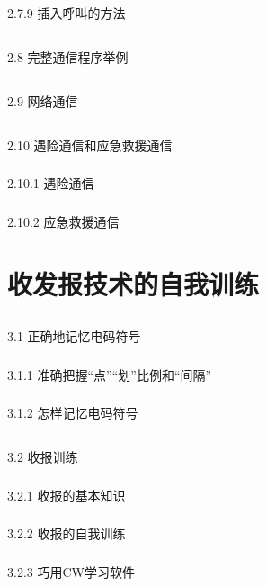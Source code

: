 \documentclass[12pt,UTF8]{ctexbook}
\begin{document}
\subsection{}2.7.9 插入呼叫的方法
\section{}2.8 完整通信程序举例
\section{}2.9 网络通信
\section{}2.10 遇险通信和应急救援通信
\subsection{}2.10.1 遇险通信
\subsection{}2.10.2 应急救援通信

\chapter{收发报技术的自我训练}

\section{}3.1 正确地记忆电码符号
\subsection{}3.1.1 准确把握“点”“划”比例和“间隔”
\subsection{}3.1.2 怎样记忆电码符号
\section{}3.2 收报训练
\subsection{}3.2.1 收报的基本知识
\subsection{}3.2.2 收报的自我训练
\subsection{}3.2.3 巧用CW学习软件
\end{document}
